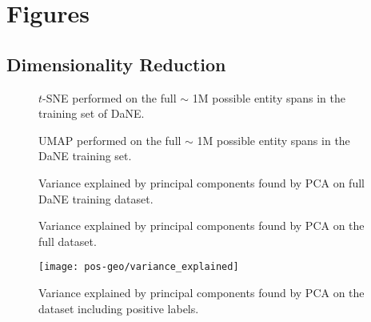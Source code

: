 \documentclass[main.tex]{subfiles}
\begin{document}
\chapter{Figures}
\section{Dimensionality Reduction}
\label{sec:dimredu}

\begin{figure}[H]
    \centering
    \caption{
        $t$-SNE performed on the full $\sim$ 1M possible entity spans in the training set of DaNE.
    }
    \label{fig:full-tsne}
\end{figure}\noindent

\begin{figure}[H]
    \centering
    \caption{
        UMAP performed on the full $\sim$ 1M possible entity spans in the DaNE training set.
    }
    \label{fig:full-umap}
\end{figure}\noindent

\begin{figure}[H]
    \centering
    \caption{
        Variance explained by principal components found by PCA on full DaNE training dataset.
    }
    \label{fig:full-varex}
\end{figure}\noindent

\begin{figure}[H]
    \centering
    \caption{
        Variance explained by principal components found by PCA on the full dataset.
    }
    \label{fig:full-varex}
\end{figure}\noindent

\begin{figure}[H]
    \centering
        \texttt{[image: pos-geo/variance\_explained]}
    \caption{
        Variance explained by principal components found by PCA on the dataset including positive labels.
    }
    \label{fig:pos-varex}
\end{figure}\noindent
\end{document}
